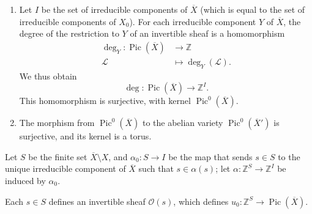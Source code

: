     
 \begin{enumerate}
      
 \item[(a)]
        Let \(I\) be the set of irreducible components of \(\overline {X}\) (which is equal to the set of irreducible components of \(X_0\)).
        For each irreducible component \(Y\) of \(\overline {X}\), the degree of the restriction to \(Y\) of an invertible sheaf is a homomorphism
        \[           \begin {aligned}             \operatorname {deg}_Y\colon  \operatorname {Pic}(\overline {X})           & \to  \mathbb {Z}           \\\mathscr {L}           & \mapsto  \operatorname {deg}_Y(\mathscr {L}).           \end {aligned}         \]
        We thus obtain
        \[           \operatorname {deg}\colon \operatorname {Pic}(\overline {X})\to \mathbb {Z}^I.         \]
        This homomorphism is surjective, with kernel \(\operatorname {Pic}^0(\overline {X})\).
      


      
 \item[(b)]
        The morphism from \(\operatorname {Pic}^0(\overline {X})\) to the abelian variety \(\operatorname {Pic}^0(\overline {X}')\) is surjective, and its kernel is a torus.
      

    \end{enumerate}\label{hodge-theory-iii-10.3.3}\par{}Let \(S\) be the finite set \(\overline {X}\setminus  X\), and \(\alpha _0\colon  S\to  I\) be the map that sends \(s\in  S\) to the unique irreducible component of \(\overline {X}\) such that \(s\in \alpha (s)\); let \(\alpha \colon \mathbb {Z}^S\to \mathbb {Z}^I\) be induced by \(\alpha _0\).\par{}Each \(s\in  S\) defines an invertible sheaf \(\mathcal {O}(s)\), which defines \(u_0\colon \mathbb {Z}^S\to \operatorname {Pic}(\overline {X})\).
